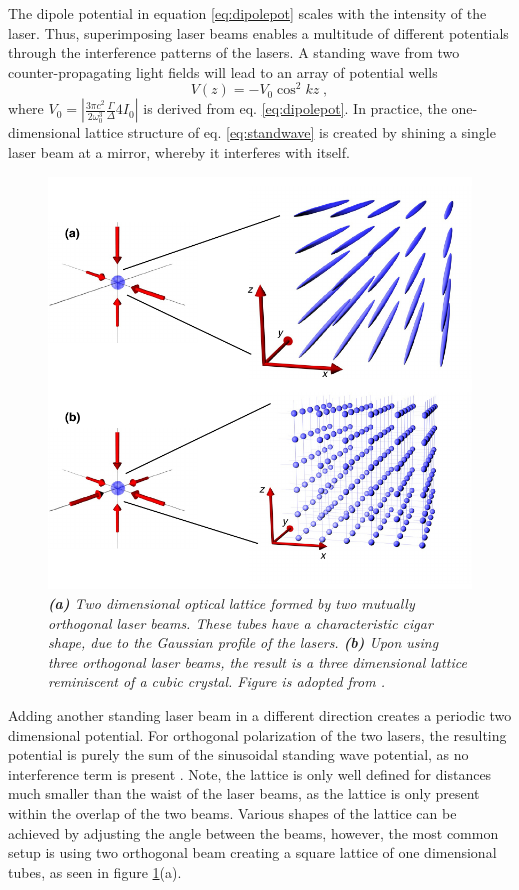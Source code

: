 The dipole potential in equation \eqref{eq:dipolepot} scales with the intensity of the laser. Thus, superimposing laser beams enables a multitude of different potentials through the interference patterns of the lasers. A standing wave from two counter-propagating light fields will lead to an array of potential wells
\begin{equation}
	V(z) = - V_0 \cos^2{k z } \; ,
	\label{eq:standwave}
\end{equation}
where $V_0 = | \frac{3 \pi c^2}{2 \omega_{0}^3} \frac{\Gamma}{\Delta} 4 I_0 |$ is derived from eq. \eqref{eq:dipolepot}. In practice, the one-dimensional lattice structure of eq. \eqref{eq:standwave} is created by shining a single laser beam at a mirror, whereby it interferes with itself.
\begin{figure}[!t]
	\centering
	\includegraphics[width=0.7\columnwidth]{Figures/OpticalLattice.pdf} 
	\caption{\textit{\textbf{(a)} Two dimensional optical lattice formed by two mutually orthogonal laser beams. These tubes have a characteristic cigar shape, due to the Gaussian profile of the lasers. \textbf{(b)} Upon using three orthogonal laser beams, the result is a three dimensional lattice reminiscent of a cubic crystal. Figure is adopted from \cite{WideraThesis}.}}
	\label{fig:OpticalLattice} 
\end{figure}
Adding another standing laser beam in a different direction creates a periodic two dimensional potential. For orthogonal polarization of the two lasers, the resulting potential is purely the sum of the sinusoidal standing wave potential, as no interference term is present \cite{lewenstein}. Note, the lattice is only well defined for distances much smaller than the waist of the laser beams, as the lattice is only present within the overlap of the two beams. Various shapes of the lattice can be achieved by adjusting the angle between the beams, however, the most common setup is using two orthogonal beam creating a square lattice of one dimensional tubes, as seen in figure \ref{fig:OpticalLattice}(a).
